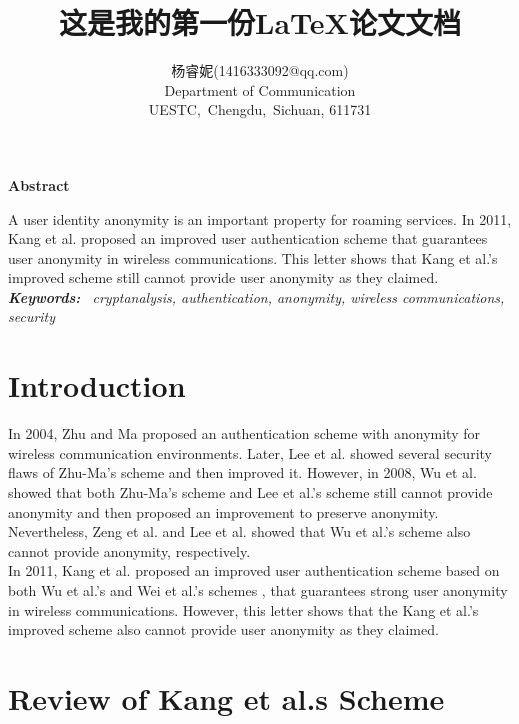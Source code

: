 \documentclass{article}
\title{这是我的第一份\LaTeX{}论文文档}
\author{杨睿妮(1416333092@qq.com) \\Department of Communication \\
UESTC,\ Chengdu,\ Sichuan, 611731}
\begin{document}
    {
        \maketitle
        \begin{center}
        \textbf{Abstract} \\
        \end{center}
        \qquad A user identity anonymity is an important property for roaming services. In 2011, Kang et al. proposed an improved user authentication scheme that guarantees user anonymity in wireless communications. This letter shows that Kang et al.'s improved scheme still cannot provide user anonymity as they claimed.\\
        \indent \emph{\textbf{Keywords:} \ cryptanalysis, authentication, anonymity, wireless communications, security} \\
\section{Introduction}
\noindent In 2004, Zhu and Ma \cite{Li10} proposed an authentication scheme with anonymity for wireless 
communication environments. Later, Lee et al. \cite{Zhang10} showed several security flaws of Zhu-Ma’s scheme and then 
improved it. However, in 2008, Wu et al. \cite{Lohr10} showed that both Zhu-Ma’s scheme and Lee et al.’s scheme still 
cannot provide anonymity and then proposed an improvement to preserve anonymity. Nevertheless, Zeng et al. 
\cite{WangWRL10} and Lee et al. \cite{Barsoum11} showed that Wu et al.’s scheme also cannot provide anonymity, respectively.\\ \indent In 2011, Kang et al. \cite{ZYan122} proposed an improved user authentication scheme based on both Wu et al.’s and 
Wei et al.’s schemes \cite{Lohr10}, \cite{Ateniese11} that guarantees strong user anonymity in wireless communications. However, this 
letter shows that the Kang et al.’s improved scheme also cannot provide user anonymity as they claimed.
    }
\section{Review of Kang et al.s Scheme}
\end{document}
